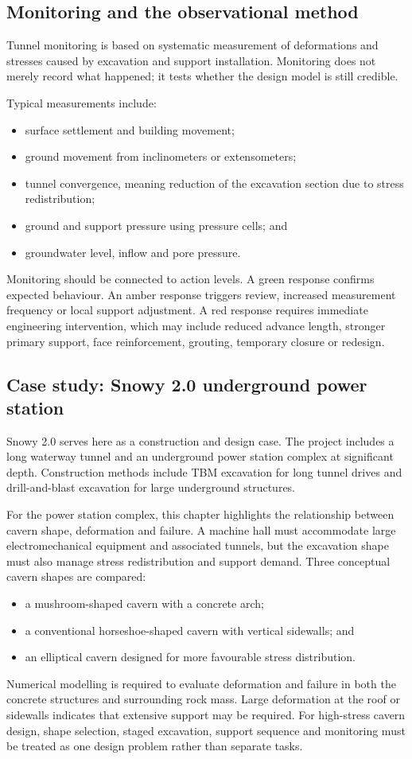 \subsection{Monitoring and the observational method}
\label{sec:monitoring}
Tunnel monitoring is based on systematic measurement of deformations and stresses caused by excavation and support installation. Monitoring does not merely record what happened; it tests whether the design model is still credible.

Typical measurements include:
\begin{itemize}
 \item surface settlement and building movement;
 \item ground movement from inclinometers or extensometers;
 \item tunnel convergence, meaning reduction of the excavation section due to stress redistribution;
 \item ground and support pressure using pressure cells; and
 \item groundwater level, inflow and pore pressure.
\end{itemize}

Monitoring should be connected to action levels. A green response confirms expected behaviour. An amber response triggers review, increased measurement frequency or local support adjustment. A red response requires immediate engineering intervention, which may include reduced advance length, stronger primary support, face reinforcement, grouting, temporary closure or redesign.

\subsection{Case study: Snowy 2.0 underground power station}
\label{sec:case-snowy-cavern}
Snowy 2.0 serves here as a construction and design case. The project includes a long waterway tunnel and an underground power station complex at significant depth. Construction methods include TBM excavation for long tunnel drives and drill-and-blast excavation for large underground structures.

For the power station complex, this chapter highlights the relationship between cavern shape, deformation and failure. A machine hall must accommodate large electromechanical equipment and associated tunnels, but the excavation shape must also manage stress redistribution and support demand. Three conceptual cavern shapes are compared:
\begin{itemize}
 \item a mushroom-shaped cavern with a concrete arch;
 \item a conventional horseshoe-shaped cavern with vertical sidewalls; and
 \item an elliptical cavern designed for more favourable stress distribution.
\end{itemize}
Numerical modelling is required to evaluate deformation and failure in both the concrete structures and surrounding rock mass. Large deformation at the roof or sidewalls indicates that extensive support may be required. For high-stress cavern design, shape selection, staged excavation, support sequence and monitoring must be treated as one design problem rather than separate tasks.
